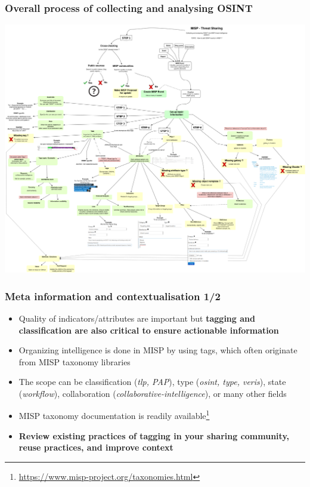 \begin{frame}
        \frametitle{Overall process of collecting and analysing OSINT}
        \includegraphics[scale=0.17]{OSINT_MISP_almostcomplete.png}
\end{frame}

\begin{frame}
\frametitle{Meta information and contextualisation 1/2}
\begin{itemize}
\item Quality of indicators/attributes are important but {\bf tagging and classification are also critical to ensure actionable information}
        \item Organizing intelligence is done in MISP by using tags, which often originate from MISP taxonomy libraries
        \item The scope can be classification ({\it tlp, PAP}), type ({\it osint, type, veris}), state ({\it workflow}), collaboration ({\it collaborative-intelligence}), or many other fields
        \item MISP taxonomy documentation is readily available\footnote{\url{https://www.misp-project.org/taxonomies.html}}
        \item {\bf Review existing practices of tagging in your sharing community, reuse practices, and improve context}
\end{itemize}
\end{frame}

